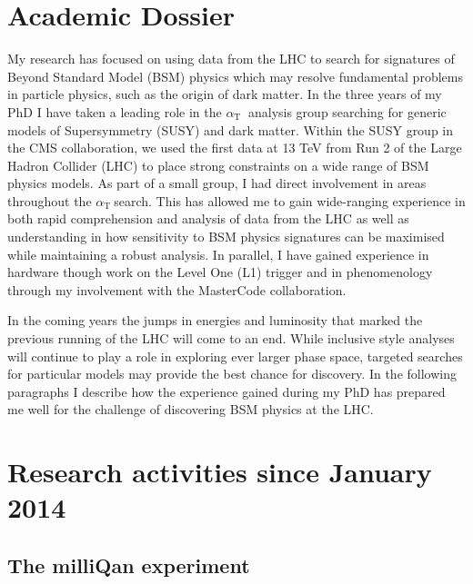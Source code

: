 \documentclass[11pt]{article}
\theoremstyle{plain} \numberwithin{equation}{section}
\theoremstyle{definition}
\DeclareRobustCommand{\alphat}{$\alpha_{\text{T}}~$}
\begin{document}
\section*{Academic Dossier}
\noindent 
My research has focused on using data from the LHC to search for signatures of Beyond Standard Model (BSM) physics which may resolve 
fundamental problems in particle physics, such as the origin of dark matter. 
In the three years of my PhD I have taken a leading role in the \alphat 
analysis group searching for generic models of Supersymmetry (SUSY) and dark matter. 
Within the SUSY group in the CMS collaboration, we used the first data at 13 TeV from Run 2 of the 
Large Hadron Collider (LHC) to place strong constraints on a wide range of BSM physics models. 
As part of a small group, I had direct involvement in areas throughout the \alphat search. 
This has allowed me to gain wide-ranging experience in both rapid comprehension
and analysis of data from the LHC as well as understanding in how sensitivity to BSM physics signatures can be maximised
while maintaining a robust analysis. In parallel, I have gained experience in hardware though work on the 
Level One (L1) trigger and in phenomenology through my involvement with the MasterCode collaboration.

In the coming years the jumps in energies and luminosity that marked the previous running of the 
LHC will come to an end. While inclusive style analyses will continue to play a role in 
exploring ever larger phase space, targeted searches for particular models 
may provide the best chance for discovery. In the following paragraphs I describe how the experience 
gained during my PhD has prepared me well for the challenge of discovering BSM physics at the LHC.

\section*{Research activities since January 2014}

\subsection*{The milliQan experiment}
\end{document}
